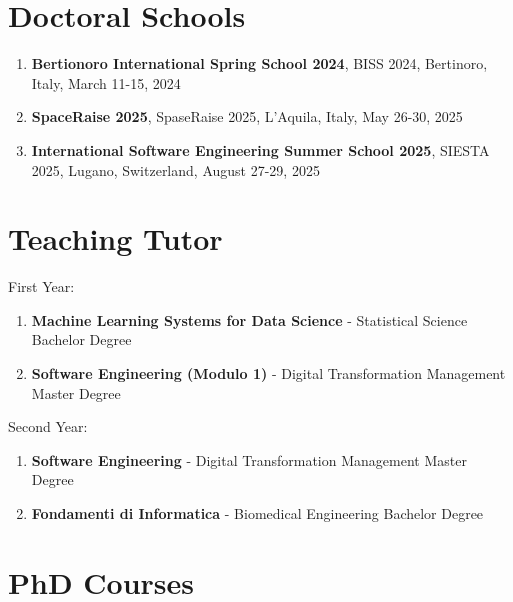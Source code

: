 \documentclass[runningheads]{llncs}
\begin{document}
\section{Doctoral Schools}
\begin{enumerate}
    \item \textbf{Bertionoro International Spring School 2024}, BISS 2024, Bertinoro, Italy, March 11-15, 2024
    \item \textbf{SpaceRaise 2025}, SpaseRaise 2025, L'Aquila, Italy, May 26-30, 2025
    \item \textbf{International Software Engineering Summer School 2025}, SIESTA 2025, Lugano, Switzerland, August 27-29, 2025
\end{enumerate}

\section{Teaching Tutor}
First Year:
\begin{enumerate}
    \item \textbf{Machine Learning Systems for Data Science} - Statistical Science Bachelor Degree
    \item \textbf{Software Engineering (Modulo 1)} - Digital Transformation Management Master Degree
\end{enumerate}
\noindent
Second Year:
\begin{enumerate}
    \item \textbf{Software Engineering} - Digital Transformation Management Master Degree
    \item \textbf{Fondamenti di Informatica} - Biomedical Engineering Bachelor Degree
\end{enumerate}

\section{PhD Courses}
\end{document}
